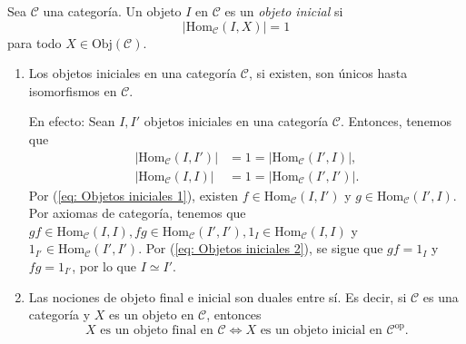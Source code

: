 \documentclass[tesis]{subfiles}
\begin{document}
%

\begin{Def}\label{Def: Objeto inicial}
    Sea $\mathscr{C}$ una categoría. Un objeto $I$ en $\mathscr{C}$ es un \emph{objeto inicial} si
    \[
    |\text{Hom}_\mathscr{C}(I,X)| = 1
    \] 
    para todo $X\in\text{Obj}(\mathscr{C})$.
\end{Def}

\begin{Obs}\leavevmode\label{Obs: Objetos iniciales}
    \begin{enumerate}[label=(\arabic*)]
    
        \item Los objetos iniciales en una categoría $\mathscr{C}$, si existen, son únicos hasta isomorfismos en $\mathscr{C}$.

    \vspace{1mm}
    En efecto: Sean $I,I'$ objetos iniciales en una categoría $\mathscr{C}$. Entonces, tenemos que
    \begin{align}
        |\text{Hom}_\mathscr{C}(I,I')| &= 1 = |\text{Hom}_\mathscr{C}(I',I)|, \label{eq: Objetos iniciales 1} \\
        |\text{Hom}_\mathscr{C}(I,I)| &= 1 = |\text{Hom}_\mathscr{C}(I',I')|. \label{eq: Objetos iniciales 2}
    \end{align}
    Por (\ref{eq: Objetos iniciales 1}), existen $f\in\text{Hom}_\mathscr{C}(I,I')$ y $g\in\text{Hom}_\mathscr{C}(I',I)$. Por axiomas de categoría, tenemos que $gf\in\text{Hom}_\mathscr{C}(I,I), fg\in\text{Hom}_\mathscr{C}(I',I'), 1_I\in\text{Hom}_\mathscr{C}(I,I)$ y $1_{I'}\in\text{Hom}_\mathscr{C}(I',I')$. Por (\ref{eq: Objetos iniciales 2}), se sigue que $gf=1_I$ y $fg=1_{I'}$, por lo que $I\simeq I'$.

        \item Las nociones de objeto final e inicial son duales entre sí. Es decir, si $\mathscr{C}$ es una categoría y $X$ es un objeto en $\mathscr{C}$, entonces
            \[
                X \text{ es un objeto final en } \mathscr{C} \iff X \text{ es un objeto inicial en } \mathscr{C}^\text{op}.
            \] 
    \end{enumerate}
\end{Obs}
\end{document}
